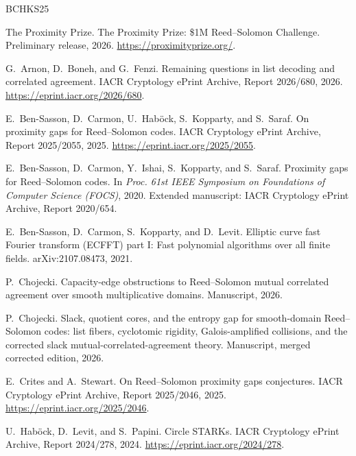 \documentclass[11pt]{article}
\theoremstyle{definition}
\theoremstyle{remark}
\begin{document}
\begin{thebibliography}{BCHKS25}

The Proximity Prize.
\newblock The Proximity Prize: \$1M Reed--Solomon Challenge.
\newblock Preliminary release, 2026.
\newblock \url{https://proximityprize.org/}.

G.~Arnon, D.~Boneh, and G.~Fenzi.
\newblock Remaining questions in list decoding and correlated agreement.
\newblock IACR Cryptology ePrint Archive, Report 2026/680, 2026.
\newblock \url{https://eprint.iacr.org/2026/680}.

E.~Ben-Sasson, D.~Carmon, U.~Hab{\"o}ck, S.~Kopparty, and S.~Saraf.
\newblock On proximity gaps for Reed--Solomon codes.
\newblock IACR Cryptology ePrint Archive, Report 2025/2055, 2025.
\newblock \url{https://eprint.iacr.org/2025/2055}.

E.~Ben-Sasson, D.~Carmon, Y.~Ishai, S.~Kopparty, and S.~Saraf.
\newblock Proximity gaps for Reed--Solomon codes.
\newblock In \emph{Proc. 61st IEEE Symposium on Foundations of Computer Science (FOCS)}, 2020.
\newblock Extended manuscript: IACR Cryptology ePrint Archive, Report 2020/654.

E.~Ben-Sasson, D.~Carmon, S.~Kopparty, and D.~Levit.
\newblock Elliptic curve fast Fourier transform (ECFFT) part I: Fast polynomial algorithms over all finite fields.
\newblock arXiv:2107.08473, 2021.

P.~Chojecki.
\newblock Capacity-edge obstructions to Reed--Solomon mutual correlated agreement over smooth multiplicative domains.
\newblock Manuscript, 2026.

P.~Chojecki.
\newblock Slack, quotient cores, and the entropy gap for smooth-domain Reed--Solomon codes: list fibers, cyclotomic rigidity, Galois-amplified collisions, and the corrected slack mutual-correlated-agreement theory.
\newblock Manuscript, merged corrected edition, 2026.

E.~Crites and A.~Stewart.
\newblock On Reed--Solomon proximity gaps conjectures.
\newblock IACR Cryptology ePrint Archive, Report 2025/2046, 2025.
\newblock \url{https://eprint.iacr.org/2025/2046}.

U.~Hab{\"o}ck, D.~Levit, and S.~Papini.
\newblock Circle STARKs.
\newblock IACR Cryptology ePrint Archive, Report 2024/278, 2024.
\newblock \url{https://eprint.iacr.org/2024/278}.

\end{thebibliography}
\end{document}
